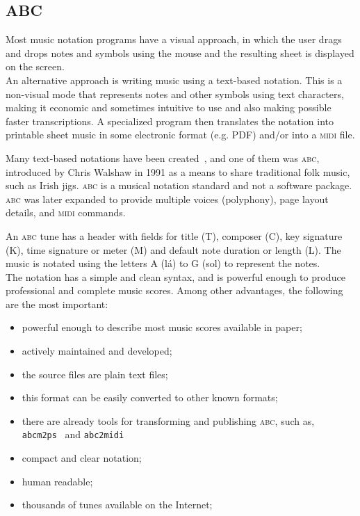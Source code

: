 \documentclass[a4paper,UKenglish]{oasics}
\newcommand{\abc}{\textsc{abc}}
\newcommand{\midi}{\textsc{midi} }
\newcommand{\abcmtops}{\texttt{abcm2ps}}
\newcommand{\abctomidi}{\texttt{abc2midi}}
\begin{document}
\subsection{ABC}

    Most music notation programs have a visual approach, in which the user drags and drops notes and
    symbols using the mouse and the resulting sheet is displayed on the screen.\\
    An alternative approach is writing music using a text-based notation. This is a non-visual mode
    that represents notes and other symbols using text characters, making it economic and sometimes
    intuitive to use and also making possible faster transcriptions. A specialized program then
    translates the notation into printable sheet music in some electronic format (e.g. PDF) and/or
    into a \midi file.

    Many text-based notations have been created~\cite{lilypond:Online,musicxml:Online}, and one of
    them was \abc, introduced by Chris Walshaw in 1991 as a means to share traditional folk music,
    such as Irish jigs. \abc{} is a musical notation standard and not a software package.
    \abc{} was later expanded to provide multiple voices (polyphony), page layout details,
    and \midi commands.

    An \abc{} tune has a header with fields for title (T), composer (C), key signature
    (K), time signature or meter (M) and default note duration or length (L). The music is notated
    using the letters A (lá) to G (sol) to represent the notes.\\
    The notation has a simple and clean syntax, and is powerful enough to produce professional and
    complete music scores. Among other advantages, the following are the most important: 
    \begin{itemize}
      \item powerful enough to describe most music scores available in paper; 
      \item actively maintained and developed; 
      \item the source files are plain text files; 
      \item this format can be easily converted to other known formats; 
      \item there are already tools for transforming and publishing \abc{}, such as,
        \abcmtops~\cite{abcm2ps:Online} and \abctomidi~\cite{abc2midi:Online}
      \item compact and clear notation; 
      \item human readable;
      \item thousands of tunes available on the Internet; 
    \end{itemize}
\end{document}

